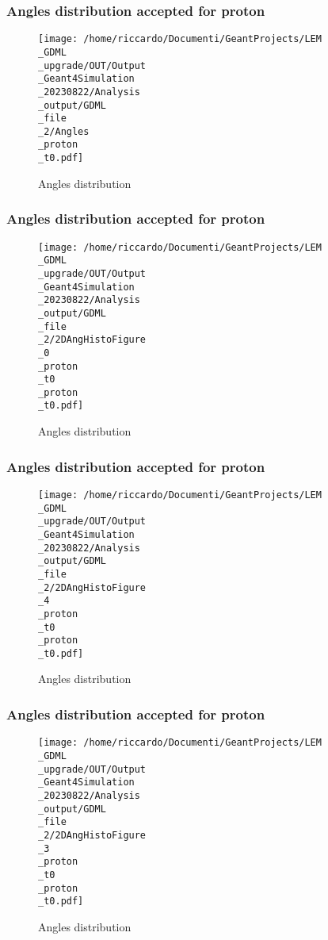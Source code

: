 \documentclass[8pt]{beamer}
\begin{document}
            \begin{frame}
                \frametitle{Angles distribution accepted for proton}
            
        \begin{figure}[h]
            \centering
            \texttt{[image: /home/riccardo/Documenti/GeantProjects/LEM\\\_GDML\\\_upgrade/OUT/Output\\\_Geant4Simulation\\\_20230822/Analysis\\\_output/GDML\\\_file\\\_2/Angles\\\_proton\\\_t0.pdf]}
            \caption{Angles distribution}
        \end{figure}
        
            \end{frame}
            
            \begin{frame}
                \frametitle{Angles distribution accepted for proton}
            
        \begin{figure}[h]
            \centering
            \texttt{[image: /home/riccardo/Documenti/GeantProjects/LEM\\\_GDML\\\_upgrade/OUT/Output\\\_Geant4Simulation\\\_20230822/Analysis\\\_output/GDML\\\_file\\\_2/2DAngHistoFigure\\\_0\\\_proton\\\_t0\\\_proton\\\_t0.pdf]}
            \caption{Angles distribution}
        \end{figure}
        
            \end{frame}
            
            \begin{frame}
                \frametitle{Angles distribution accepted for proton}
            
        \begin{figure}[h]
            \centering
            \texttt{[image: /home/riccardo/Documenti/GeantProjects/LEM\\\_GDML\\\_upgrade/OUT/Output\\\_Geant4Simulation\\\_20230822/Analysis\\\_output/GDML\\\_file\\\_2/2DAngHistoFigure\\\_4\\\_proton\\\_t0\\\_proton\\\_t0.pdf]}
            \caption{Angles distribution}
        \end{figure}
        
            \end{frame}
            
            \begin{frame}
                \frametitle{Angles distribution accepted for proton}
            
        \begin{figure}[h]
            \centering
            \texttt{[image: /home/riccardo/Documenti/GeantProjects/LEM\\\_GDML\\\_upgrade/OUT/Output\\\_Geant4Simulation\\\_20230822/Analysis\\\_output/GDML\\\_file\\\_2/2DAngHistoFigure\\\_3\\\_proton\\\_t0\\\_proton\\\_t0.pdf]}
            \caption{Angles distribution}
        \end{figure}
        
            \end{frame}
            
\end{document}
